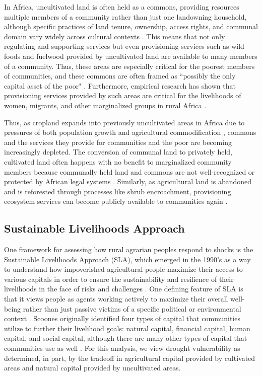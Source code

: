 \documentclass{article}
\begin{document}
In Africa, uncultivated land is often held as a commons, providing resources multiple members of a community rather than just one landowning household, although specific practices of land tenure, ownership, access rights, and communal domain vary widely across cultural contexts \cite{Wily2008}.  This means that not only regulating and supporting services but even provisioning services such as wild foods and fuelwood provided by uncultivated land are available to many members of a community.  Thus, these areas are especially critical for the poorest members of communities, and these commons are often framed as ``possibly the only capital asset of the poor" \cite{Wily2008}.  Furthermore, empirical research has shown that provisioning services provided by such areas are critical for the livelihoods of women, migrants, and other marginalized groups in rural Africa \cite{Coulibaly-Lingani2009, Pouliot2013}.

Thus, as cropland expands into previously uncultivated areas in Africa due to pressures of both population growth and agricultural commodification \citep{Rudel2013, Laurance2014}, commons and the services they provide for communities and the poor are becoming increasingly depleted.  The conversion of communal land to privately held, cultivated land often happens with no benefit to marginalized community members because communally held land and commons are not well-recognized or protected by African legal systems \citep{Wily2011}.  Similarly, as agricultural land is abandoned and is reforested through processes like shrub encroachment, provisioning ecosystem services can become publicly available to communities again \citep{Laris2008, Eldridge2011, Venter2018}.

\subsection{Sustainable Livelihoods Approach}
One framework for assessing how rural agrarian peoples respond to shocks is the Sustainable Livelihoods Approach (SLA), which emerged in the 1990's as a way to understand how impoverished agricultural people maximize their access to various capitals in order to ensure the sustainability and resilience of their livelihoods in the face of risks and challenges \cite{Scoones1998a, Ellis1998, Bebbington1999}.  One defining feature of SLA is that it views people as agents working actively to maximize their overall well-being rather than just passive victims of a specific political or environmental context \cite{Adato2002}.  Scoones originally identified four types of capital that communities utilize to further their livelihood goals: natural capital, financial capital, human capital, and social capital, although there are many other types of capital that communities use as well \cite{Scoones1998a}.  For this analysis, we view drought vulnerability as determined, in part, by the tradeoff in agricultural capital provided by cultivated areas and natural capital provided by uncultivated areas.
\end{document}
